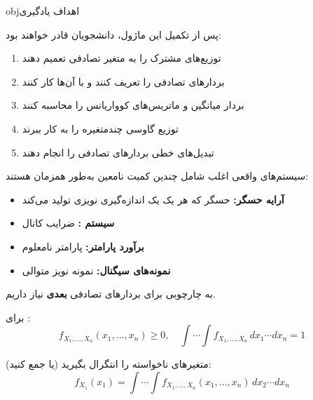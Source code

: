 \begin{PSbox}[unbreakable]{obj}{اهداف یادگیری}

پس از تکمیل این ماژول، دانشجویان قادر خواهند بود:

\begin{enumerate}
\def\labelenumi{\arabic{enumi}.}
\tightlist
\item
  توزیع‌های مشترک را به  متغیر تصادفی تعمیم دهند
\item
  بردارهای تصادفی را تعریف کنند و با آن‌ها کار کنند
\item
  بردار میانگین و ماتریس‌های کوواریانس را محاسبه کنند
\item
  توزیع گاوسی چندمتغیره را به کار ببرند
\item
  تبدیل‌های خطی بردارهای تصادفی را انجام دهند
\end{enumerate}

\end{PSbox}


سیستم‌های واقعی اغلب شامل چندین کمیت نامعین به‌طور همزمان هستند:

\begin{itemize}
\tightlist
\item
  \textbf{آرایه حسگر:}  حسگر که هر یک یک اندازه‌گیری نویزی تولید می‌کند
\item
  \textbf{سیستم :} ضرایب کانال 
\item
  \textbf{برآورد پارامتر:}  پارامتر نامعلوم
\item
  \textbf{نمونه‌های سیگنال:}  نمونه نویز متوالی
\end{itemize}

به چارچوبی برای بردارهای تصادفی \textbf{بعدی} نیاز داریم.



برای :\PSbr{}\[f_{X_1,...,X_n}(x_1,...,x_n) \geq 0, \quad \int\cdots\int f_{X_1,...,X_n} \, dx_1 \cdots dx_n = 1\]


متغیرهای ناخواسته را انتگرال بگیرید (یا جمع کنید):\PSbr{}\[f_{X_1}(x_1) = \int\cdots\int f_{X_1,...,X_n}(x_1,...,x_n) \, dx_2 \cdots dx_n\]



